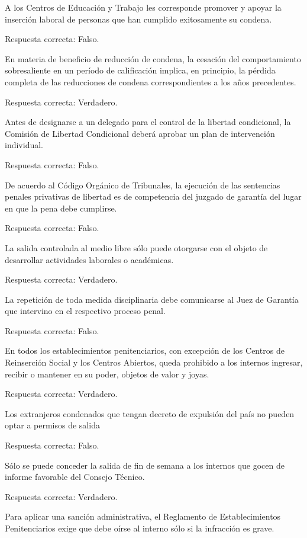 \documentclass[letterpaper, 11pt]{article}
\begin{document}
A los Centros de Educación y Trabajo les corresponde promover y apoyar la inserción
laboral de personas que han cumplido exitosamente su condena.

Respuesta correcta: Falso.

En materia de beneficio de reducción de condena, la cesación del comportamiento
sobresaliente en un período de calificación implica, en principio, la pérdida completa de las
reducciones de condena correspondientes a los años precedentes.

Respuesta correcta: Verdadero.

Antes de designarse a un delegado para el control de la libertad condicional, la Comisión
de Libertad Condicional deberá aprobar un plan de intervención individual.

Respuesta correcta: Falso.

De acuerdo al Código Orgánico de Tribunales, la ejecución de las sentencias penales
privativas de libertad es de competencia del juzgado de garantía del lugar en que la pena
debe cumplirse.

Respuesta correcta: Falso.

La salida controlada al medio libre sólo puede otorgarse con el objeto de desarrollar
actividades laborales o académicas.

Respuesta correcta: Verdadero.

La repetición de toda medida disciplinaria debe comunicarse al Juez de Garantía que
intervino en el respectivo proceso penal.

Respuesta correcta: Falso.

En todos los establecimientos penitenciarios, con excepción de los Centros de
Reinserción Social y los Centros Abiertos, queda prohibido a los internos ingresar, recibir o
mantener en su poder, objetos de valor y joyas.

Respuesta correcta: Verdadero.

Los extranjeros condenados que tengan decreto de expulsión del país no pueden optar
a permisos de salida

Respuesta correcta: Falso.

Sólo se puede conceder la salida de fin de semana a los internos que gocen de informe
favorable del Consejo Técnico.

Respuesta correcta: Verdadero.

Para aplicar una sanción administrativa, el Reglamento de Establecimientos
Penitenciarios exige que debe oírse al interno sólo si la infracción es grave.
\end{document}
